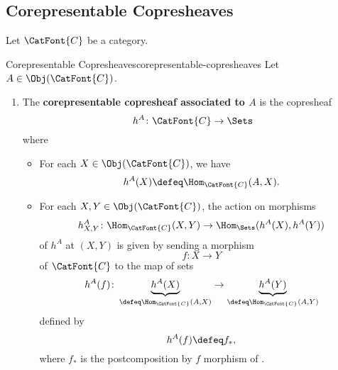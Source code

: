 \subsection{Corepresentable Copresheaves}\label{subsection-corepresentable-copresheaves}
Let $\CatFont{C}$ be a category.
\begin{definition}{Corepresentable Copresheaves}{corepresentable-copresheaves}%
    Let $A\in\Obj(\CatFont{C})$.
    \begin{enumerate}
        \item\label{corepresentable-copresheaves-corepresentable-copresheaves-associated-to-an-object}The \textbf{corepresentable copresheaf associated to $A$} is the copresheaf 
            \[
                h^{A}%
                \colon%
                \CatFont{C}%
                \to%
                \Sets%
            \]%
            where
            \begin{itemize}
                \item{}For each $X\in\Obj(\CatFont{C})$, we have
                    \[
                        h^{A}(X)
                        \defeq
                        \Hom_{\CatFont{C}}(A,X).
                    \]%
                \item{}For each $X,Y\in\Obj(\CatFont{C})$, the action on morphisms
                    \[
                        h^{A}_{X,Y}%
                        \colon%
                        \Hom_{\CatFont{C}}(X,Y)%
                        \to%
                        \Hom_{\Sets}(h^{A}(X),h^{A}(Y))%
                    \]%
                    of $h^{A}$ at $(X,Y)$ is given by sending a morphism
                    \[
                        f%
                        \colon%
                        X%
                        \to%
                        Y%
                    \]%
                    of $\CatFont{C}$ to the map of sets
                    \[
                        h^{A}(f)
                        \colon
                        \underbrace{h^{A}(X)}_{\defeq\Hom_{\CatFont{C}}(A,X)}
                        \to
                        \underbrace{h^{A}(Y)}_{\defeq\Hom_{\CatFont{C}}(A,Y)}
                    \]%
                    defined by
                    \[
                        h^{A}(f)
                        \defeq
                        f_{*},
                    \]%
                    where $f_{*}$ is the postcomposition by $f$ morphism of .

\end{itemize}
\end{enumerate}
\end{definition}
